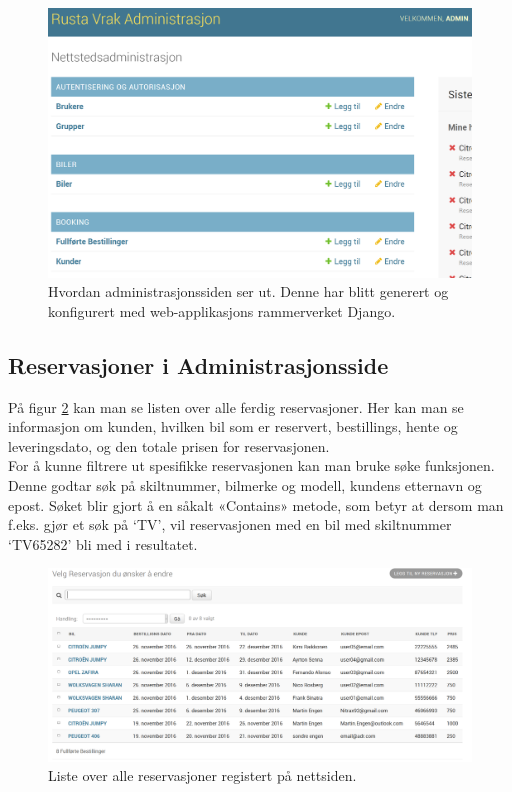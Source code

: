 \begin{figure}[htbp]
	\centering
		\includegraphics[scale=0.4]{Bilder/admin_forside.png}
	\caption[Forside i Administrasjons Side]{Hvordan administrasjonssiden ser ut. Denne har blitt generert og konfigurert med web-applikasjons rammerverket Django. } %
	\label{fig:admin_front}
\end{figure}
\newpage
\subsection{Reservasjoner i Administrasjonsside}
På figur \ref{fig:admin_list} kan man se listen over alle ferdig reservasjoner. Her kan man se informasjon om kunden, hvilken bil som er reservert, bestillings, hente og leveringsdato, og den totale prisen for reservasjonen. \\
For å kunne filtrere ut spesifikke reservasjonen kan man bruke søke funksjonen. Denne godtar søk på skiltnummer, bilmerke og modell, kundens etternavn og epost. Søket blir gjort å en såkalt «Contains» metode, som betyr at dersom man f.eks. gjør et søk på ‘TV’, vil reservasjonen med en bil med skiltnummer ‘TV65282’ bli med i resultatet.

 \begin{figure}[htbp]
	\centering
		\includegraphics[width=16cm, keepaspectratio]{Bilder/admin_liste2.png}
	\caption[Administrasjonsside - Oversikt over reservasjoner]{Liste over alle reservasjoner registert på nettsiden. } %
	\label{fig:admin_list}
\end{figure}





